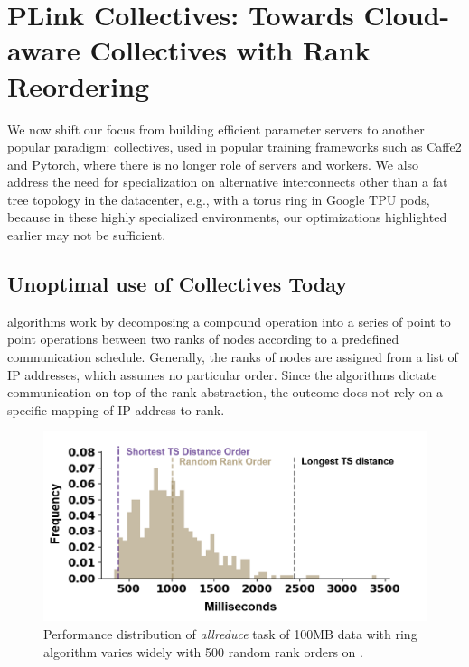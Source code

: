 \chapter{PLink Collectives: Towards Cloud-aware Collectives with Rank Reordering}
We now shift our focus from building efficient parameter servers to another popular paradigm: collectives, used in popular training frameworks such as Caffe2 and Pytorch, where there is no longer role of servers and workers. We also address the need for specialization on alternative interconnects other than a fat tree topology in the datacenter, e.g., with a torus ring in Google TPU pods, because in these highly specialized environments, our optimizations highlighted earlier may not be sufficient. 


\section{Unoptimal use of Collectives Today}
\mpi algorithms work by decomposing a compound operation into a series of point to point operations between two ranks of nodes according to a predefined communication schedule. Generally, the ranks of nodes are assigned from a list of IP addresses, which assumes no particular order. Since the \mpi algorithms dictate communication on top of the rank abstraction, the outcome does not rely on a specific mapping of IP address to rank.

\begin{figure}[ht]
	\centering
	\includegraphics[width=.5\linewidth, trim=8 3 14 14,clip]{Figures/azringperformance.png}
	\caption{Performance distribution of \textit{allreduce} task of 100MB data with ring algorithm varies widely with 500 random rank orders on \azure.}
	\label{fig:azringperformance}
\end{figure}

